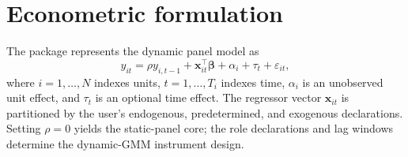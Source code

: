\documentclass[article]{jss}
\begin{document}
\section{Econometric formulation}
The package represents the dynamic panel model as
\begin{equation}
\label{eq:dynamic-panel}
y_{it}
= \rho y_{i,t-1}
+ \mathbf{x}_{it}^\top \boldsymbol{\beta}
+ \alpha_i + \tau_t + \varepsilon_{it},
\end{equation}
where $i=1,\ldots,N$ indexes units, $t=1,\ldots,T_i$ indexes time,
$\alpha_i$ is an unobserved unit effect, and $\tau_t$ is an optional time effect.
The regressor vector $\mathbf{x}_{it}$ is partitioned by the user's endogenous,
predetermined, and exogenous declarations. Setting $\rho=0$ yields the static-panel
core; the role declarations and lag windows determine the dynamic-GMM instrument design.
\end{document}
